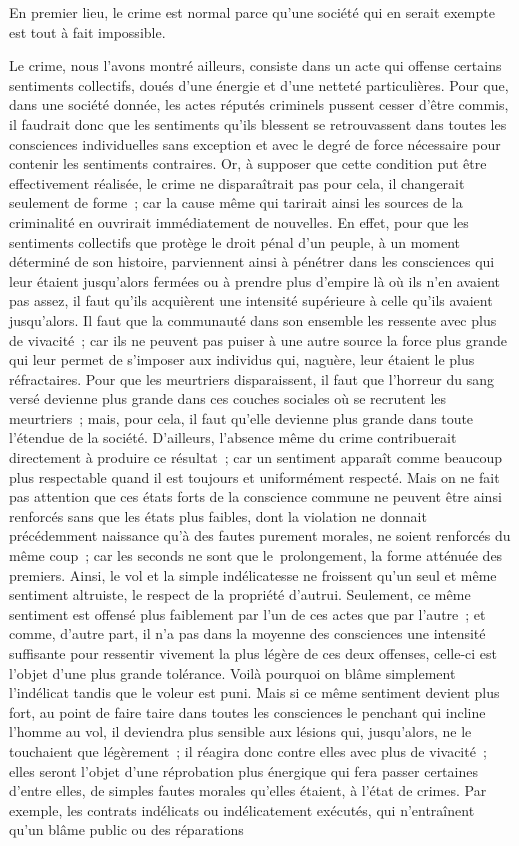 \documentclass[french,twoside]{book} %
\begin{document}
En premier lieu, le crime est normal parce qu’une société qui en serait exempte est tout à fait impossible.\par
Le crime, nous l’avons montré ailleurs, consiste dans un acte qui offense certains sentiments collectifs, doués d’une énergie et d’une netteté particulières. Pour que, dans une société donnée, les actes réputés criminels pussent cesser d’être commis, il faudrait donc que les sentiments qu’ils blessent se retrouvassent dans toutes les consciences individuelles sans exception et avec le degré de force nécessaire pour contenir les sentiments contraires. Or, à supposer que cette condition put être effectivement réalisée, le crime ne disparaîtrait pas pour cela, il changerait seulement de forme ; car la cause même qui tarirait ainsi les sources de la criminalité en ouvrirait immédiatement de nouvelles. En effet, pour que les sentiments collectifs que protège le droit pénal d’un peuple, à un moment déterminé de son histoire, parviennent ainsi à pénétrer dans les consciences qui leur étaient jusqu’alors fermées ou à prendre plus d’empire là où ils n’en avaient pas assez, il faut qu’ils acquièrent une intensité supérieure à celle qu’ils avaient jusqu’alors. Il faut que la communauté dans son ensemble les ressente avec plus de vivacité ; car ils ne peuvent pas puiser à une autre source la force plus grande qui leur permet de s’imposer aux individus qui, naguère, leur étaient le plus réfractaires. Pour que les meurtriers disparaissent, il faut que l’horreur du sang versé devienne plus grande dans ces couches sociales où se recrutent les meurtriers ; mais, pour cela, il faut qu’elle devienne plus grande dans toute l’étendue de la société. D’ailleurs, l’absence même du crime contribuerait directement à produire ce résultat ; car un sentiment apparaît comme beaucoup plus respectable quand il est toujours et uniformément respecté. Mais on ne fait pas attention que ces états forts de la conscience commune ne peuvent être ainsi renforcés sans que les états plus faibles, dont la violation ne donnait précédemment naissance qu’à des fautes purement morales, ne soient renforcés du même coup ; car les seconds ne sont que le prolongement, la forme atténuée des premiers. Ainsi, le vol et la simple indélicatesse ne froissent qu’un seul et même sentiment altruiste, le respect de la propriété d’autrui. Seulement, ce même sentiment est offensé plus faiblement par l’un de ces actes que par l’autre ; et comme, d’autre part, il n’a pas dans la moyenne des consciences une intensité suffisante pour ressentir vivement la plus légère de ces deux offenses, celle-ci est l’objet d’une plus grande tolérance. Voilà pourquoi on blâme simplement l’indélicat tandis que le voleur est puni. Mais si ce même sentiment devient plus fort, au point de faire taire dans toutes les consciences le penchant qui incline l’homme au vol, il deviendra plus sensible aux lésions qui, jusqu’alors, ne le touchaient que légèrement ; il réagira donc contre elles avec plus de vivacité ; elles seront l’objet d’une réprobation plus énergique qui fera passer certaines d’entre elles, de simples fautes morales qu’elles étaient, à l’état de crimes. Par exemple, les contrats indélicats ou indélicatement exécutés, qui n’entraînent qu’un blâme public ou des réparations 
\end{document}
